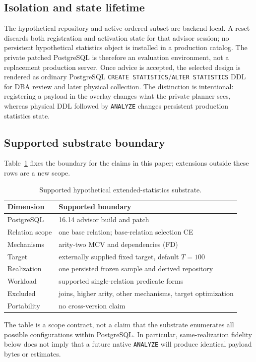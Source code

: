 \subsection{Isolation and state lifetime}

The hypothetical repository and active ordered subset are backend-local.  A
reset discards both registration and activation state for that advisor
session; no persistent hypothetical statistics object is installed in a
production catalog.  The private patched PostgreSQL is therefore an
evaluation environment, not a replacement production server.  Once advice is
accepted, the selected design is rendered as ordinary PostgreSQL
\texttt{CREATE STATISTICS}/\texttt{ALTER STATISTICS} DDL for DBA review and
later physical collection.  The distinction is intentional: registering a
payload in the overlay changes what the private planner sees, whereas
physical DDL followed by \texttt{ANALYZE} changes persistent production
statistics state.

\subsection{Supported substrate boundary}

Table~\ref{tab:substrate-scope} fixes the boundary for the claims in this
paper; extensions outside these rows are a new scope.

\begin{table}[t]
\caption{Supported hypothetical extended-statistics substrate.}
\label{tab:substrate-scope}
\centering
\small
\begin{tabular}{p{}p{}}
\toprule
Dimension & Supported boundary \\
\midrule
PostgreSQL & 16.14 advisor build and patch \\
Relation scope & one base relation; base-relation selection CE \\
Mechanisms & arity-two MCV and dependencies (FD) \\
Target & externally supplied fixed target, default $T=100$ \\
Realization & one persisted frozen sample and derived repository \\
Workload & supported single-relation predicate forms \\
Excluded & joins, higher arity, other mechanisms, target optimization \\
Portability & no cross-version claim \\
\bottomrule
\end{tabular}
\end{table}

The table is a scope contract, not a claim that the substrate enumerates all
possible configurations within PostgreSQL.  In particular, same-realization
fidelity below does not imply that a future native \texttt{ANALYZE} will
produce identical payload bytes or estimates.
